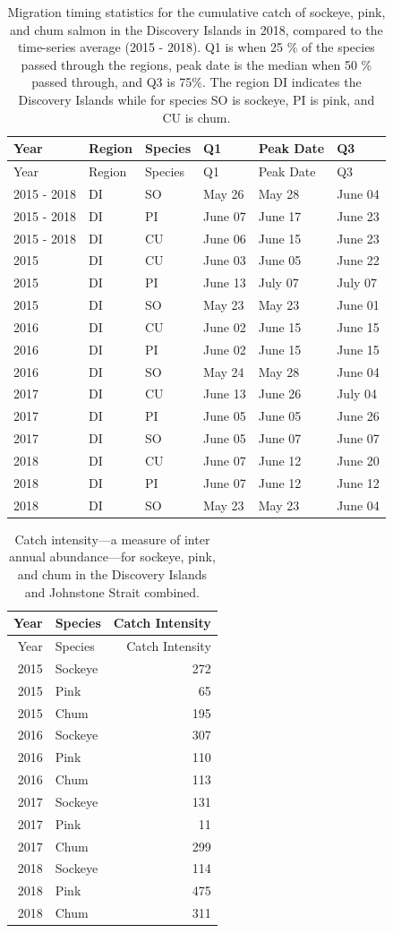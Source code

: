 \documentclass[fleqn,10pt]{wlpeerj} %
\begin{document}
\begin{longtable}[]{@{}llllll@{}}
\caption{\label{tab:mtdi} Migration timing statistics for the cumulative
catch of sockeye, pink, and chum salmon in the Discovery Islands in
2018, compared to the time-series average (2015 - 2018). Q1 is when 25
\% of the species passed through the regions, peak date is the median
when 50 \% passed through, and Q3 is 75\%. The region DI indicates the
Discovery Islands while for species SO is sockeye, PI is pink, and CU is
chum.}\tabularnewline
\toprule
Year & Region & Species & Q1 & Peak Date & Q3\tabularnewline
\midrule
\endfirsthead
\toprule
Year & Region & Species & Q1 & Peak Date & Q3\tabularnewline
\midrule
\endhead
2015 - 2018 & DI & SO & May 26 & May 28 & June 04\tabularnewline
2015 - 2018 & DI & PI & June 07 & June 17 & June 23\tabularnewline
2015 - 2018 & DI & CU & June 06 & June 15 & June 23\tabularnewline
2015 & DI & CU & June 03 & June 05 & June 22\tabularnewline
2015 & DI & PI & June 13 & July 07 & July 07\tabularnewline
2015 & DI & SO & May 23 & May 23 & June 01\tabularnewline
2016 & DI & CU & June 02 & June 15 & June 15\tabularnewline
2016 & DI & PI & June 02 & June 15 & June 15\tabularnewline
2016 & DI & SO & May 24 & May 28 & June 04\tabularnewline
2017 & DI & CU & June 13 & June 26 & July 04\tabularnewline
2017 & DI & PI & June 05 & June 05 & June 26\tabularnewline
2017 & DI & SO & June 05 & June 07 & June 07\tabularnewline
2018 & DI & CU & June 07 & June 12 & June 20\tabularnewline
2018 & DI & PI & June 07 & June 12 & June 12\tabularnewline
2018 & DI & SO & May 23 & May 23 & June 04\tabularnewline
\bottomrule
\end{longtable}

\begin{longtable}[]{@{}rlr@{}}
\caption{\label{tab:catch-intensity} Catch intensity---a measure of inter
annual abundance---for sockeye, pink, and chum in the Discovery Islands
and Johnstone Strait combined.}\tabularnewline
\toprule
Year & Species & Catch Intensity\tabularnewline
\midrule
\endfirsthead
\toprule
Year & Species & Catch Intensity\tabularnewline
\midrule
\endhead
2015 & Sockeye & 272\tabularnewline
2015 & Pink & 65\tabularnewline
2015 & Chum & 195\tabularnewline
2016 & Sockeye & 307\tabularnewline
2016 & Pink & 110\tabularnewline
2016 & Chum & 113\tabularnewline
2017 & Sockeye & 131\tabularnewline
2017 & Pink & 11\tabularnewline
2017 & Chum & 299\tabularnewline
2018 & Sockeye & 114\tabularnewline
2018 & Pink & 475\tabularnewline
2018 & Chum & 311\tabularnewline
\bottomrule
\end{longtable}
\end{document}
